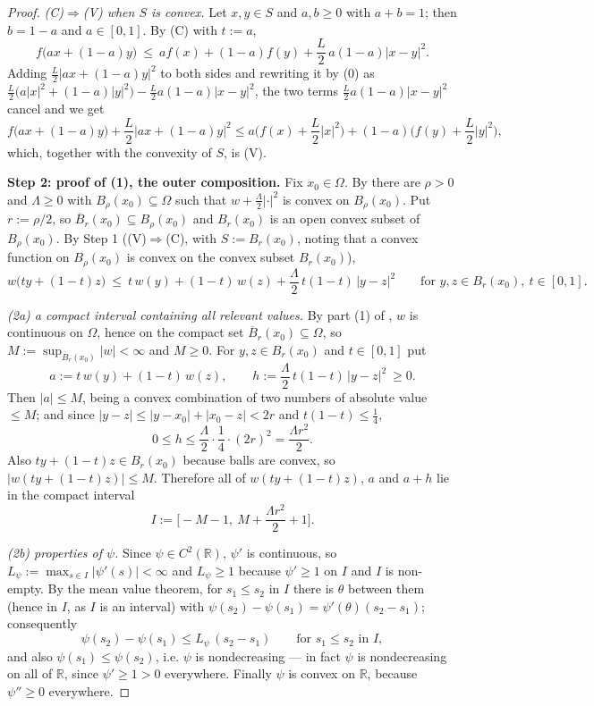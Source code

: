\begin{proof}
\emph{(C)$\Rightarrow$(V) when $S$ is convex.} Let $x,y\in S$ and $a,b\ge0$ with $a+b=1$;
then $b=1-a$ and $a\in[0,1]$. By (C) with $t:=a$,
\[
 f\big(ax+(1-a)y\big)\ \le\ a f(x)+(1-a)f(y)+\frac L2\,a(1-a)|x-y|^{2}.
\]
Adding $\tfrac L2|ax+(1-a)y|^{2}$ to both sides and rewriting it by (0) as
$\tfrac L2\big(a|x|^{2}+(1-a)|y|^{2}\big)-\tfrac L2 a(1-a)|x-y|^{2}$, the two terms
$\tfrac L2a(1-a)|x-y|^{2}$ cancel and we get
\[
 f\big(ax+(1-a)y\big)+\frac L2\big|ax+(1-a)y\big|^{2}
  \le a\Big(f(x)+\frac L2|x|^{2}\Big)+(1-a)\Big(f(y)+\frac L2|y|^{2}\Big),
\]
which, together with the convexity of $S$, is (V).

\medskip\noindent\textbf{Step 2: proof of (1), the outer composition.} Fix $x_0\in\Omega$.
By  there are $\rho>0$ and $\Lambda\ge0$ with
$B_\rho(x_0)\subseteq\Omega$ such that $w+\tfrac\Lambda2|\cdot|^{2}$ is convex on
$B_\rho(x_0)$. Put $r:=\rho/2$, so $\overline B_r(x_0)\subseteq B_\rho(x_0)$ and $B_r(x_0)$
is an open convex subset of $B_\rho(x_0)$. By Step 1 ((V)$\Rightarrow$(C), with
$S:=B_r(x_0)$, noting that a convex function on $B_\rho(x_0)$ is convex on the convex subset
$B_r(x_0)$),
\[
 w\big(ty+(1-t)z\big)\ \le\ t\,w(y)+(1-t)\,w(z)+\frac\Lambda2\,t(1-t)\,|y-z|^{2}
 \qquad\text{for }y,z\in B_r(x_0),\ t\in[0,1]. \tag{2}
\]

\emph{(2a) a compact interval containing all relevant values.} By part (1) of
, $w$ is continuous on $\Omega$, hence on the compact set
$\overline B_r(x_0)\subseteq\Omega$, so
$M:=\sup_{\overline B_r(x_0)}|w|<\infty$ and $M\ge0$. For $y,z\in B_r(x_0)$ and
$t\in[0,1]$ put
\[
 a:=t\,w(y)+(1-t)\,w(z),\qquad h:=\frac\Lambda2\,t(1-t)\,|y-z|^{2}\ \ge0 .
\]
Then $|a|\le M$, being a convex combination of two numbers of absolute value $\le M$; and
since $|y-z|\le|y-x_0|+|x_0-z|<2r$ and $t(1-t)\le\tfrac14$,
\[
 0\le h\le\frac\Lambda2\cdot\frac14\cdot(2r)^{2}=\frac{\Lambda r^{2}}{2} .
\]
Also $ty+(1-t)z\in B_r(x_0)$ because balls are convex, so
$|w(ty+(1-t)z)|\le M$. Therefore all of $w(ty+(1-t)z)$, $a$ and $a+h$ lie in the compact
interval
\[
 I:=\Big[-M-1,\ M+\frac{\Lambda r^{2}}{2}+1\Big].
\]

\emph{(2b) properties of $\psi$.} Since $\psi\in C^{2}(\mathbb R)$, $\psi'$ is continuous, so
$L_\psi:=\max_{s\in I}|\psi'(s)|<\infty$ and $L_\psi\ge1$ because $\psi'\ge1$ on $I$ and $I$
is non-empty. By the mean value theorem, for $s_1\le s_2$ in $I$ there is $\theta$ between
them (hence in $I$, as $I$ is an interval) with
$\psi(s_2)-\psi(s_1)=\psi'(\theta)(s_2-s_1)$; consequently
\[
 \psi(s_2)-\psi(s_1)\le L_\psi\,(s_2-s_1)\qquad\text{for }s_1\le s_2\text{ in }I, \tag{3}
\]
and also $\psi(s_1)\le\psi(s_2)$, i.e. $\psi$ is nondecreasing --- in fact $\psi$ is
nondecreasing on all of $\mathbb R$, since $\psi'\ge1>0$ everywhere. Finally $\psi$ is convex
on $\mathbb R$, because $\psi''\ge0$ everywhere.


\end{proof}
